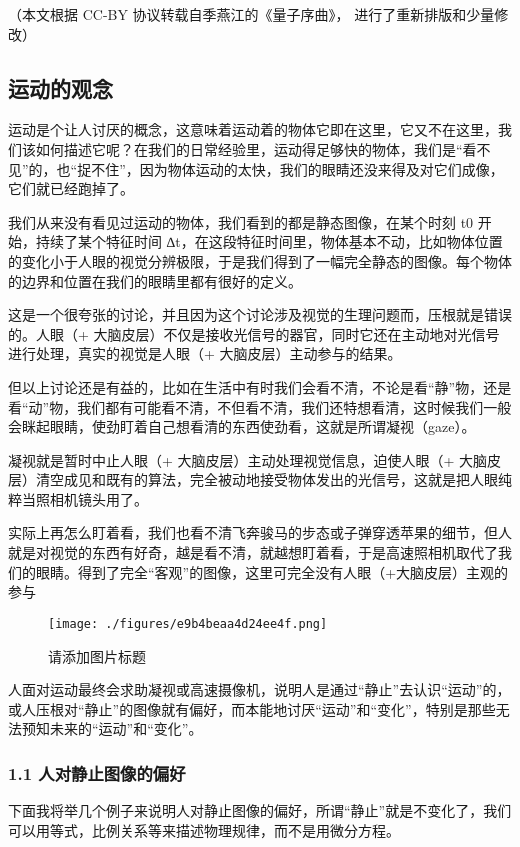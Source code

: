 
（本文根据 CC-BY 协议转载自季燕江的《量子序曲》， 进行了重新排版和少量修改）

\subsection{运动的观念}
运动是个让⼈讨厌的概念，这意味着运动着的物体它即在这里，它又不在这里，我们该如何描述它呢？在我们的日常经验里，运动得⾜够快的物体，我们是“看不见”的，也“捉不住”，因为物体运动的太快，我们的眼睛还没来得及对它们成像，它们就已经跑掉了。

我们从来没有看见过运动的物体，我们看到的都是静态图像，在某个时刻 t0 开始，持续了某个特征时间 ∆t，在这段特征时间里，物体基本不动，比如物体位置的变化小于⼈眼的视觉分辨极限，于是我们得到了⼀幅完全静态的图像。每个物体的边界和位置在我们的眼睛里都有很好的定义。

这是⼀个很夸张的讨论，并且因为这个讨论涉及视觉的⽣理问题⽽，压根就是错误的。⼈眼（+ ⼤脑皮层）不仅是接收光信号的器官，同时它还在主动地对光信号进⾏处理，真实的视觉是⼈眼（+ ⼤脑皮层）主动参与的结果。

但以上讨论还是有益的，比如在⽣活中有时我们会看不清，不论是看“静”物，还是看“动”物，我们都有可能看不清，不但看不清，我们还特想看清，这时候我们⼀般会眯起眼睛，使劲盯着自⼰想看清的东西使劲看，这就是所谓凝视（gaze）。

凝视就是暂时中⽌⼈眼（+ ⼤脑皮层）主动处理视觉信息，迫使⼈眼（+ ⼤脑皮层）清空成见和既有的算法，完全被动地接受物体发出的光信号，这就是把⼈眼纯粹当照相机镜头用了。

实际上再怎么盯着看，我们也看不清飞奔骏马的步态或⼦弹穿透苹果的细节，但⼈就是对视觉的东西有好奇，越是看不清，就越想盯着看，于是⾼速照相机取代了我们的眼睛。得到了完全“客观”的图像，这里可完全没有⼈眼（+⼤脑皮层）主观的参与
\begin{figure}[ht]
\centering
\texttt{[image: ./figures/e9b4beaa4d24ee4f.png]}
\caption{请添加图片标题} \label{fig_AtomId_10}
\end{figure}

⼈面对运动最终会求助凝视或⾼速摄像机，说明⼈是通过“静⽌”去认识“运动”的，或⼈压根对“静⽌”的图像就有偏好，⽽本能地讨厌“运动”和“变化”，特别是那些⽆法预知未来的“运动”和“变化”。

\subsubsection{1.1 人对静止图像的偏好}
下面我将举⼏个例⼦来说明⼈对静⽌图像的偏好，所谓“静⽌”就是不变化了，我们可以用等式，比例关系等来描述物理规律，⽽不是用微分⽅程。

